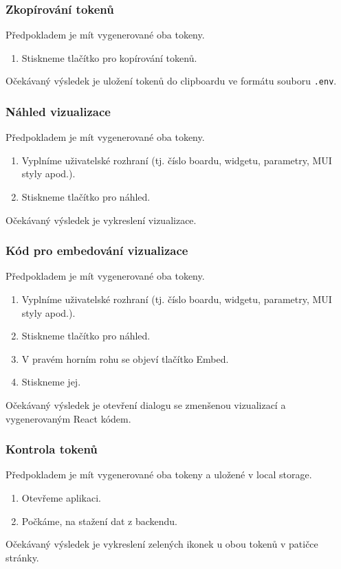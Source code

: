\documentclass[czech, bc, kiv, he, iso690numb]{fasthesis}
\begin{document}
\subsubsection{Zkopírování tokenů}
Předpokladem je mít vygenerované oba tokeny.
\begin{enumerate}
	\item Stiskneme tlačítko pro kopírování tokenů.
\end{enumerate}
Očekávaný výsledek je uložení tokenů do clipboardu ve formátu souboru \texttt{.env}.

\subsubsection{Náhled vizualizace}
Předpokladem je mít vygenerované oba tokeny.
\begin{enumerate}
	\item Vyplníme uživatelské rozhraní (tj. číslo boardu, widgetu, parametry, MUI styly apod.).
	\item Stiskneme tlačítko pro náhled.
\end{enumerate}
Očekávaný výsledek je vykreslení vizualizace.

\subsubsection{Kód pro embedování vizualizace}
Předpokladem je mít vygenerované oba tokeny.
\begin{enumerate}
	\item Vyplníme uživatelské rozhraní (tj. číslo boardu, widgetu, parametry, MUI styly apod.).
	\item Stiskneme tlačítko pro náhled.
	\item V pravém horním rohu se objeví tlačítko Embed.
	\item Stiskneme jej.
\end{enumerate}
Očekávaný výsledek je otevření dialogu se zmenšenou vizualizací a vygenerovaným React kódem.

\subsubsection{Kontrola tokenů}
Předpokladem je mít vygenerované oba tokeny a uložené v local storage.

\begin{enumerate}
	\item Otevřeme aplikaci.
	\item Počkáme, na stažení dat z backendu.
\end{enumerate}
Očekávaný výsledek je vykreslení zelených ikonek u obou tokenů v patičce stránky.
\end{document}

